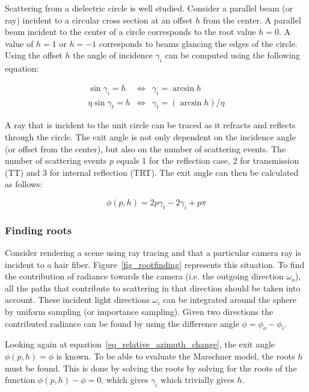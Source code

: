 \documentclass[11pt,a4paper]{report}
\begin{document}
Scattering from a dielectric circle is well studied. Consider a parallel beam (or ray) incident to a circular cross section at an offset $h$ from the center. A parallel beam incident to the center of a circle corresponds to the root value $h = 0$. A value of $h=1$ or $h=-1$ corresponds to beams glancing the edges of the circle. Using the offset $h$ the angle of incidence $\gamma_i$ can be computed using the following equation:

\begin{eqnarray*}
\sin \gamma_i = h & \Leftrightarrow & \gamma_i = \arcsin h \\
\eta \sin \gamma_t = h & \Leftrightarrow & \gamma_t = (\arcsin h) / \eta
\end{eqnarray*}

A ray that is incident to the unit circle can be traced as it refracts and reflects through the circle. The exit angle is not only dependent on the incidence angle (or offset from the center), but also on the number of scattering events. The number of scattering events $p$ equals 1 for the reflection case, 2 for transmission (TT) and 3 for internal reflection (TRT). The exit angle can then be calculated as follows:

\begin{equation}
\label{eq_relative_azimuth_change}
\phi(p,h) = 2p \gamma_t - 2 \gamma_i + p \pi
\end{equation}

\subsubsection{Finding roots}

Consider rendering a scene using ray tracing and that a particular camera ray is incident to a hair fiber. Figure~\ref{fig_rootfinding} represents this situation. To find the contribution of radiance towards the camera (i.e. the outgoing direction $\omega_o$), all the paths that contribute to scattering in that direction should be taken into account. These incident light directions $\omega_i$ can be integrated around the sphere by uniform sampling (or importance sampling). Given two directions the contributed radiance can be found by using the difference angle $\phi = \phi_o - \phi_i$.

Looking again at equation~\ref{eq_relative_azimuth_change}, the exit angle $\phi(p, h) = \phi$ is known. To be able to evaluate the Marschner model, the roots $h$ must be found. This is done by solving the roots by solving for the roots of the function $\phi(p, h) - \phi = 0$, which gives $\gamma_i$ which trivially gives $h$.
\end{document}
